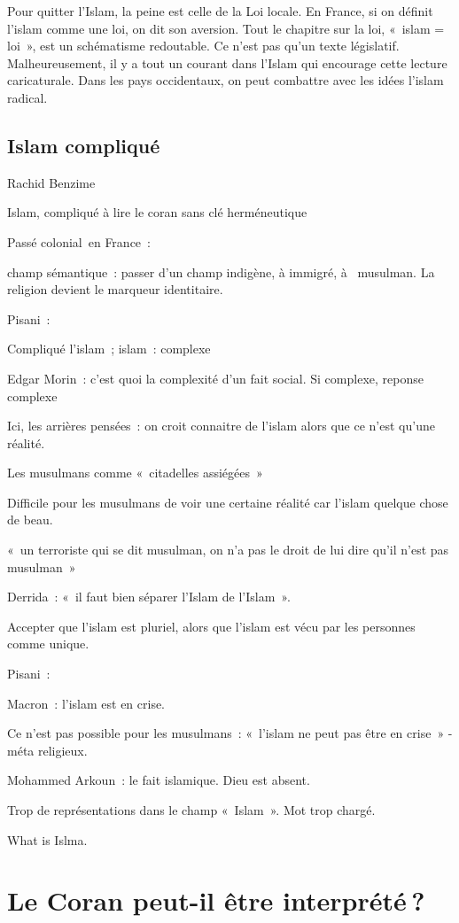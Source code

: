   Pour quitter l'Islam, la peine est celle de la Loi locale. En France,
  si on définit l'islam comme une loi, on dit son aversion. Tout le
  chapitre sur la loi, «~islam = loi~», est un schématisme redoutable.
  Ce n'est pas qu'un texte législatif. Malheureusement, il y a tout un
  courant dans l'Islam qui encourage cette lecture caricaturale. Dans
  les pays occidentaux, on peut combattre avec les idées l'islam
  radical.
  
  
  \subsection{Islam compliqué}


Rachid Benzime

Islam, compliqué à lire le coran sans clé herméneutique

Passé colonial~en France~:

champ sémantique~: passer d'un champ indigène, à immigré, à ~musulman.
La religion devient le marqueur identitaire.

Pisani~:

Compliqué l'islam~; islam~: complexe

Edgar Morin~: c'est quoi la complexité d'un fait social. Si complexe,
reponse complexe

Ici, les arrières pensées~: on croit connaitre de l'islam alors que ce
n'est qu'une réalité.

Les musulmans comme «~citadelles assiégées~»

Difficile pour les musulmans de voir une certaine réalité car l'islam
quelque chose de beau.

«~un terroriste qui se dit musulman, on n'a pas le droit de lui dire
qu'il n'est pas musulman~»

Derrida~: «~il faut bien séparer l'Islam de l'Islam~».

Accepter que l'islam est pluriel, alors que l'islam est vécu par les
personnes comme unique.

Pisani~:

Macron~: l'islam est en crise.

Ce n'est pas possible pour les musulmans~: «~l'islam ne peut pas être en
crise~» - méta religieux.

Mohammed Arkoun~: le fait islamique. Dieu est absent.

Trop de représentations dans le champ «~Islam~». Mot trop chargé.

What is Islma.

\section{Le Coran peut-il être interprété ?}

